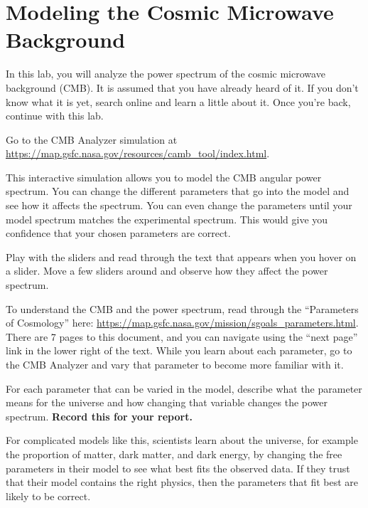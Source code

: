 \chapter{Modeling the Cosmic Microwave Background}

In this lab, you will analyze the power spectrum of the cosmic microwave background (CMB). It is assumed that you have already heard of it. If you don't know what it is yet, search online and learn a little about it. Once you're back, continue with this lab.

\begin{steps}
	\item Go to the CMB Analyzer simulation at \url{https://map.gsfc.nasa.gov/resources/camb_tool/index.html}.
\end{steps}

This interactive simulation allows you to model the CMB angular power spectrum. You can change the different parameters that go into the model and see how it affects the spectrum. You can even change the parameters until your model spectrum matches the experimental spectrum. This would give you confidence that your chosen parameters are correct.

\begin{steps}
	\item Play with the sliders and read through the text that appears when you hover on a slider. Move a few sliders around and observe how they affect the power spectrum.
	
	\item To understand the CMB and the power spectrum, read through the ``Parameters of Cosmology'' here: \url{https://map.gsfc.nasa.gov/mission/sgoals_parameters.html}. There are 7 pages to this document, and you can navigate using the ``next page'' link in the lower right of the text. While you learn about each parameter, go to the CMB Analyzer and vary that parameter to become more familiar with it.
	
	\item For each parameter that can be varied in the model, describe what the parameter means for the universe and how changing that variable changes the power spectrum. \textbf{Record this for your report.}
\end{steps}
	
For complicated models like this, scientists learn about the universe, for example the proportion of matter, dark matter, and dark energy, by changing the free parameters in their model to see what best fits the observed data. If they trust that their model contains the right physics, then the parameters that fit best are likely to be correct.

